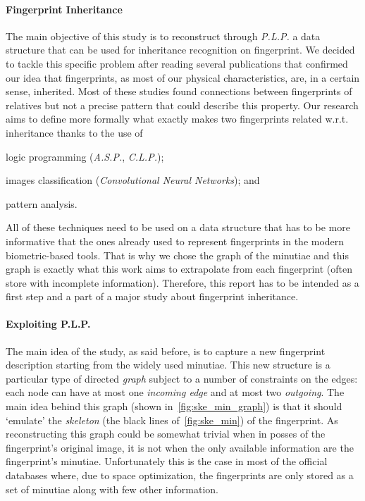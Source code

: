 \documentclass[8pt]{article}
\begin{document}
  \paragraph{Fingerprint Inheritance}\label{par:heredity}
  The main objective of this study is to reconstruct through \textit{P.L.P.} a data structure that can be used for inheritance recognition on fingerprint.
  We decided to tackle this specific problem after reading several publications that confirmed our idea that fingerprints, as most of our physical characteristics, are, in a certain sense, inherited.
  Most of these studies found connections between fingerprints of relatives but not a precise pattern that could describe this property.
  Our research aims to define more formally what exactly makes two fingerprints related w.r.t. inheritance thanks to the use of
  \begin{enumerate*}[label=\roman*)]
  	\item logic programming (\textit{A.S.P.}, \textit{C.L.P.});
  	\item images classification (\textit{Convolutional Neural Networks}); and
  	\item pattern analysis.
  \end{enumerate*}
	All of these techniques need to be used on a data structure that has to be more informative that the ones already used to represent fingerprints in the modern biometric-based tools. That is why we chose the graph of the minutiae and this graph is exactly what this work aims to extrapolate from each fingerprint (often store with incomplete information).
Therefore, this report has to be intended as a first step and a part of a major
study about fingerprint inheritance.

  \paragraph{Exploiting P.L.P.}
    The main idea of the study, as said before, is to capture a new fingerprint description starting from the widely used minutiae.
    This new structure is a particular type of directed \textit{graph} subject
    to a number of constraints on the edges: each node can have at most one \textit{incoming edge} and at most two \textit{outgoing}.
    The main idea behind this graph (shown in~\cref{fig:ske_min_graph}) is that it should \textquoteleft emulate' the \textit{skeleton} (the black lines of~\cref{fig:ske_min}) of the fingerprint.
    As reconstructing this graph could be somewhat trivial when in posses of the fingerprint's original image, it is not when the only available information are the fingerprint's minutiae.
    Unfortunately this is the case in most of the official databases where, due to space optimization, the fingerprints are only stored as a set of minutiae along with few other information.
    
\end{document}
